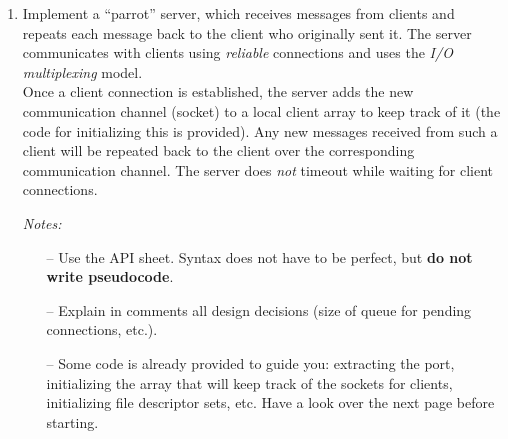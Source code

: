 \documentclass[11pt]{article}
\begin{document}
\begin{enumerate}
	\newpage
	\item Implement a “parrot” server, which receives messages from clients and repeats each message back to the client who originally sent it. The server communicates with clients using \textit{reliable} connections and uses the \textit{I/O multiplexing} model.\\
	Once a client connection is established, the server adds the new communication channel (socket) to a local client array to keep track of it (the code for initializing this is provided). Any new messages received from such a client will be repeated back to the client over the corresponding communication channel. The server does \textit{not} timeout while waiting for client connections.

	\textit{Notes:} \begin{itemize}
			\item[--]  Use the API sheet. Syntax does not have to be perfect, but \textbf{do not write pseudocode}.
			\item[--] Explain in comments all design decisions (size of queue for pending connections, etc.).
			\item[--] Some code is already provided to guide you: extracting the port, initializing the array that will keep track of the sockets for clients, initializing file descriptor sets, etc. Have a look over the next page before starting.
		\end{itemize}
\end{enumerate}
\end{document}
